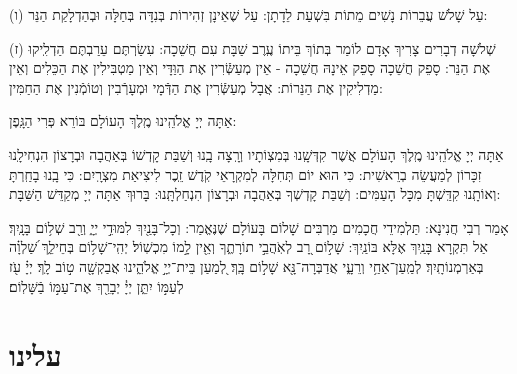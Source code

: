 \documentclass[twoside, openany, parskip=half, 11pt]{book}
\begin{document}
(ו) עַל שָׁלֹשׁ עֲבֵרוֹת נָשִׁים מֵתוֹת בִּשְׁעַת לֵדָתָן: עַל שֶׁאֵינָן זְהִירוֹת בְּנִדָּה בְּחַלָּה וּבְהַדְלָקַת הַנֵּר:

(ז) שְׁלֹשָׁה דְבָרִים צָרִיךְ אָדָם לוֹמַר בְּתוֹךְ בֵּיתוֹ עֶֽרֶב שַׁבָּת עִם חֲשֵׁכָה: עִשַׂרְתֶּם עֵרַבְתֶּם הַדְלִֽיקוּ אֶת הַנֵּר: סָפֵק חֲשֵׁכָה סָפֵק אֵינָהּ חֲשֵׁכָה - אֵין מְעַשְּֿׂרִין אֶת הַוַּדָּי וְאֵין מַטְבִּילִין אֶת הַכֵּלִים וְאֵין מַדְלִיקִין אֶת הַנֵּרוֹת: אֲבָל מְעַשְּֿׂרִין אֶת הַדְּֿמָי וּמְעָרְֿבִין וְטוֹמְֿנִין אֶת הַחַמִּין:



 אַתָּה יְיָ אֱלֹהֵֽינוּ מֶֽלֶךְ הָעוֹלָם בּוֹרֵא פְּרִי הַגָּֽפֶן:

 אַתָּה יְיָ אֱלֹהֵֽינוּ מֶֽלֶךְ הָעוֹלָם אֲשֶׁר קִדְּשָֽׁנוּ בְּמִצְוֹתָיו וְרָֽצָה בָֽנוּ וְשַׁבַּת קָדְשׁוֹ בְּאַהֲבָה וּבְרָצוֹן הִנְחִילָֽנוּ זִכָּרוֹן לְמַעֲשֵׂה בְרֵאשִׁית: כִּי הוּא יוֹם תְּחִלָּה לְמִקְרָאֵי קֹֽדֶשׁ זֵֽכֶר לִיצִיאַת מִצְרָֽיִם: כִּי בָֽנוּ בָחַֽרְתָּ וְאוֹתָֽנוּ קִדַּֽשְׁתָּ מִכָּל הָעַמִּים: וְשַׁבַּת קָדְשְׁךָ בְּאַהֲבָה וּבְרָצוֹן הִנְחַלְתָּֽנוּ: בָּרוּךְ אַתָּה יְיָ מְקַדֵּשׁ הַשַּׁבָּת:

\sepline

  
  אָמַר רְבִי חֲנִינָא: תַּלְמִידֵי חֲכָמִים מַרְבִּים שָׁלוֹם בָּעוֹלָם שֶׁנֶּאֱמַר:
וְכָל־בָּנַ֖יִךְ לִמּוּדֵ֣י יְיָ֑ וְרַ֖ב שְׁל֥וֹם בָּנָֽיִךְ׃ אַל תִּקְרָא בָּנַֽיִךְ אֶלָּא בּוֹנַֽיִךְ: שָׁל֣וֹם רָ֭ב לְאֹֽהֲבֵ֣י תוֹרָתֶ֑ךָ וְאֵ֖ין לָ֣מוֹ מִכְשֽׁוֹל׃ יְהִֽי־שָׁל֥וֹם בְּחֵילֵ֑ךְ שַׁ֝לְוָ֗ה בְּאַרְמְנוֹתָֽיִךְ׃  לְמַֽעַן־אַחַ֥י וְרֵעָ֑י אֲדַבְּרָה־נָּ֖א שָׁל֣וֹם בָּֽךְ׃ לְ֭מַעַן בֵּית־יְיָ֣ אֱלֹהֵ֑ינוּ אֲבַקְשָׁ֖ה ט֣וֹב לָֽךְ׃
יְיָ֗ עֹ֖ז לְעַמּ֣וֹ יִתֵּ֑ן יְיָ֓   יְבָרֵ֖ךְ אֶת־עַמּ֣וֹ בַֿשָּׁלֽוֹם׃


\mournerskaddish

\section*{ עלינו }
\aleinu



\end{document}
